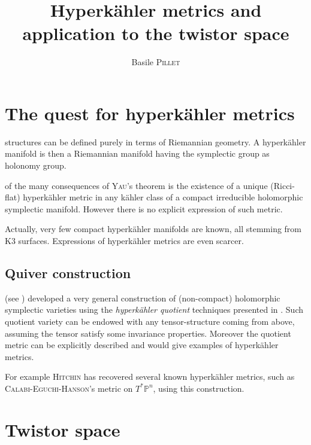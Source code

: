 \documentclass[a3, 14pt, ruledsections]{sciposter}
\title{
Hyperk\"{a}hler metrics and application to the twistor space\bigskip
}
\author{Basile \textsc{Pillet}}
\institute{University of Rennes 1\\
            And Rennes Mathematical Institute for Research (IRMAR)}
\begin{document}
\maketitle


\begin{multicols}{2}
\section*{The quest for hyperk\"{a}hler metrics}

 structures can be defined purely in terms of Riemannian geometry. A hyperk\"{a}hler manifold is then a Riemannian manifold having the symplectic group as holonomy group.

 of the many consequences of \textsc{Yau}'s theorem is the existence of a unique (Ricci-flat) hyperk\"{a}hler metric in any k\"{a}hler class of a compact irreducible holomorphic symplectic manifold. However there is no explicit expression of such metric.

Actually, very few compact hyperk\"{a}hler manifolds are known, all stemming from \textsc{K3} surfaces. Expressions of hyperk\"{a}hler metrics are even scarcer.

\subsection*{Quiver construction}

 (see \cite{nakajima, Schiffmann}) developed a very general construction of (non-compact) holomorphic symplectic varieties using the \textit{hyperk\"{a}hler quotient} techniques presented in \cite{HKLR}. Such quotient variety can be endowed with any tensor-structure coming from above, assuming the tensor satisfy some invariance properties. Moreover the quotient metric can be explicitly described and would give examples of hyperk\"{a}hler metrics.

For example \textsc{Hitchin} has recovered several known hyperk\"{a}hler metrics, such as \textsc{Calabi-Eguchi-Hanson}'s metric on $T^*\mathbb{P}^n$, using this construction.

\section*{Twistor space}


\end{multicols}
\end{document}
